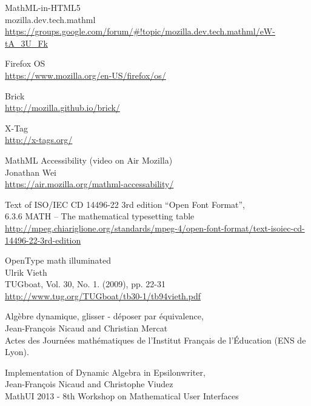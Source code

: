 \begin{thebibliography}{8}
MathML-in-HTML5 \\
mozilla.dev.tech.mathml \\
\href{https://groups.google.com/forum/#!topic/mozilla.dev.tech.mathml/eW-tA_3U_Fk}{https://groups.google.com/forum/\#!topic/mozilla.dev.tech.mathml/eW-tA\_3U\_Fk}

Firefox OS \\
\href{https://www.mozilla.org/en-US/firefox/os/}{https://www.mozilla.org/en-US/firefox/os/}

Brick \\
\href{http://mozilla.github.io/brick/}{http://mozilla.github.io/brick/}

X-Tag \\
\href{http://x-tags.org/}{http://x-tags.org/}

MathML Accessibility (video on Air Mozilla) \\
Jonathan Wei \\
\href{https://air.mozilla.org/mathml-accessability/}{https://air.mozilla.org/mathml-accessability/}

Text of ISO/IEC CD 14496-22 3rd edition ``Open Font Format'', \\
6.3.6 MATH – The mathematical typesetting table \\
\href{http://mpeg.chiariglione.org/standards/mpeg-4/open-font-format/text-isoiec-cd-14496-22-3rd-edition}{http://mpeg.chiariglione.org/standards/mpeg-4/open-font-format/text-isoiec-cd-14496-22-3rd-edition}

OpenType math illuminated \\
Ulrik Vieth \\
TUGboat, Vol. 30, No. 1. (2009), pp. 22-31 \\
\href{http://www.tug.org/TUGboat/tb30-1/tb94vieth.pdf}{http://www.tug.org/TUGboat/tb30-1/tb94vieth.pdf}

Algèbre dynamique, glisser - déposer par équivalence, \\
Jean-François Nicaud and Christian Mercat \\
Actes des Journées mathématiques de l'Institut Français de l'Éducation (ENS de Lyon).

Implementation of Dynamic Algebra in Epsilonwriter, \\
Jean-François Nicaud and Christophe Viudez \\
MathUI 2013 - 8th Workshop on Mathematical User Interfaces


\end{thebibliography}
